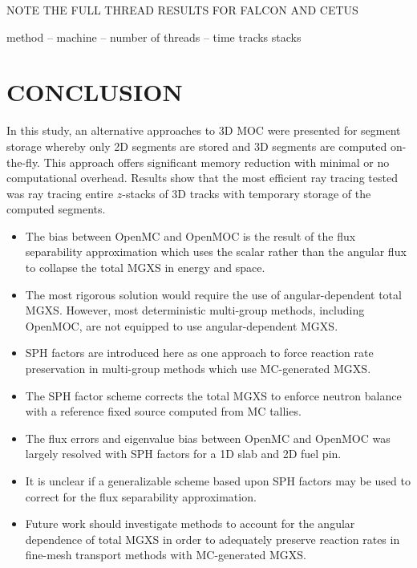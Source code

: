 NOTE THE FULL THREAD RESULTS FOR FALCON AND CETUS

	method --	machine -- number of threads -- time
tracks
stacks



%
\section{CONCLUSION} 

In this study, an alternative approaches to 3D \ac{MOC} were presented for segment storage whereby only 2D segments are stored and 3D segments are computed on-the-fly. This approach offers significant memory reduction with minimal or no computational overhead. Results show that the most efficient ray tracing tested was ray tracing entire $z$-stacks of 3D tracks with temporary storage of the computed segments.
\clearpage

\vfill
\begin{highlightsbox}[frametitle=Highlights]
\begin{itemize}
  \item The bias between OpenMC and OpenMOC is the result of the flux separability approximation which uses the scalar rather than the angular flux to collapse the total \ac{MGXS} in energy and space.
  \item The most rigorous solution would require the use of angular-dependent total \ac{MGXS}. However, most deterministic multi-group methods, including OpenMOC, are not equipped to use angular-dependent \ac{MGXS}.
  \item \ac{SPH} factors are introduced here as one approach to force reaction rate preservation in multi-group methods which use \ac{MC}-generated \ac{MGXS}.
  \item The \ac{SPH} factor scheme corrects the total \ac{MGXS} to enforce neutron balance with a reference fixed source computed from \ac{MC} tallies.
  \item The flux errors and eigenvalue bias between OpenMC and OpenMOC was largely resolved with \ac{SPH} factors for a 1D slab and 2D fuel pin.
  \item It is unclear if a generalizable scheme based upon \ac{SPH} factors may be used to correct for the flux separability approximation.
  \item Future work should investigate methods to account for the angular dependence of total \ac{MGXS} in order to adequately preserve reaction rates in fine-mesh transport methods with \ac{MC}-generated \ac{MGXS}.
\end{itemize}
\end{highlightsbox}
\vfill